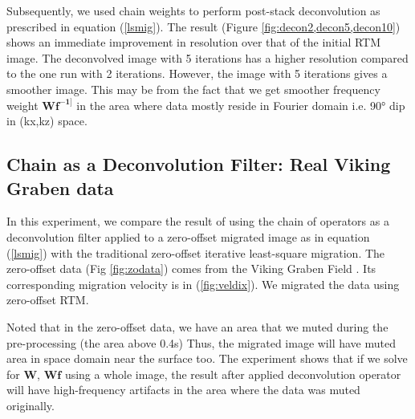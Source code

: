 

%

Subsequently, we used chain weights to perform post-stack deconvolution as prescribed in equation (\ref{lsmig}). The result (Figure \ref{fig:decon2,decon5,decon10}) shows an immediate improvement in resolution over that of the initial RTM image. The deconvolved image with 5 iterations has a higher resolution compared to the one run with 2 iterations. However, the image with 5 iterations gives a smoother image. This may be from the fact that we get smoother frequency weight $\mathbf{Wf^{-1]}}$ in the area where data mostly reside in Fourier domain i.e. 90° dip in (kx,kz) space.



%
%

\subsection*{Chain as a Deconvolution Filter: Real Viking Graben data}

In this experiment, we compare the result of using the chain of operators as a deconvolution filter applied to a zero-offset migrated image as in equation (\ref{lsmig}) with the traditional zero-offset iterative least-square migration. The zero-offset data (Fig \ref{fig:zodata}) comes from the Viking Graben Field \cite[]{keys1998comparison}. Its corresponding migration velocity is in (\ref{fig:veldix}). We migrated the data using zero-offset RTM. 


Noted that in the zero-offset data, we have an area that we muted during the pre-processing (the area above 0.4s) Thus, the migrated image will have muted area in space domain near the surface too. The experiment shows that if we solve for $\mathbf{W}$, $\mathbf{Wf}$ using a whole image, the result after applied deconvolution operator will have high-frequency artifacts in the area where the data was muted originally.

